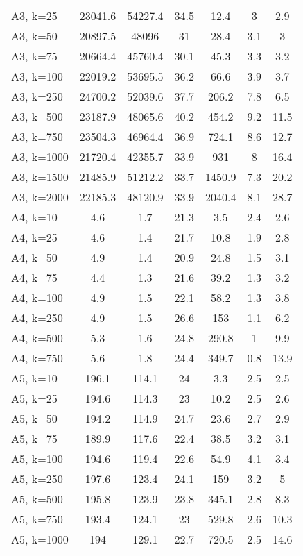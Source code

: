\documentclass{article}
\begin{document}
\begin{center}
\begin{table}[h]
\begin{tabular}{|l||c|c|c|c|c|c|}
    A3, k=25 & 23041.6 & 54227.4 & 34.5 & 12.4 & 3 & 2.9\\
    A3, k=50 & 20897.5 & 48096 & 31 & 28.4 & 3.1 & 3\\
    A3, k=75 & 20664.4 & 45760.4 & 30.1 & 45.3 & 3.3 & 3.2\\
    A3, k=100 & 22019.2 & 53695.5 & 36.2 & 66.6 & 3.9 & 3.7\\
    A3, k=250 & 24700.2 & 52039.6 & 37.7 & 206.2 & 7.8 & 6.5\\
    A3, k=500 & 23187.9 & 48065.6 & 40.2 & 454.2 & 9.2 & 11.5\\
    A3, k=750 & 23504.3 & 46964.4 & 36.9 & 724.1 & 8.6 & 12.7\\
    A3, k=1000 & 21720.4 & 42355.7 & 33.9 & 931 & 8 & 16.4\\
    A3, k=1500 & 21485.9 & 51212.2 & 33.7 & 1450.9 & 7.3 & 20.2\\
A3, k=2000 & 22185.3 & 48120.9 & 33.9 & 2040.4 & 8.1 & 28.7\\
    \hline
    A4, k=10 & 4.6 & 1.7 & 21.3 & 3.5 & 2.4 & 2.6\\
    A4, k=25 & 4.6 & 1.4 & 21.7 & 10.8 & 1.9 & 2.8\\
    A4, k=50 & 4.9 & 1.4 & 20.9 & 24.8 & 1.5 & 3.1\\
    A4, k=75 & 4.4 & 1.3 & 21.6 & 39.2 & 1.3 & 3.2\\
    A4, k=100 & 4.9 & 1.5 & 22.1 & 58.2 & 1.3 & 3.8\\
    A4, k=250 & 4.9 & 1.5 & 26.6 & 153 & 1.1 & 6.2\\
    A4, k=500 & 5.3 & 1.6 & 24.8 & 290.8 & 1 & 9.9\\
    A4, k=750 & 5.6 & 1.8 & 24.4 & 349.7 & 0.8 & 13.9\\
    \hline
    A5, k=10 & 196.1 & 114.1 & 24 & 3.3 & 2.5 & 2.5\\
    A5, k=25 & 194.6 & 114.3 & 23 & 10.2 & 2.5 & 2.6\\
    A5, k=50 & 194.2 & 114.9 & 24.7 & 23.6 & 2.7 & 2.9\\
    A5, k=75 & 189.9 & 117.6 & 22.4 & 38.5 & 3.2 & 3.1\\
    A5, k=100 & 194.6 & 119.4 & 22.6 & 54.9 & 4.1 & 3.4\\
    A5, k=250 & 197.6 & 123.4 & 24.1 & 159 & 3.2 & 5\\
    A5, k=500 & 195.8 & 123.9 & 23.8 & 345.1 & 2.8 & 8.3\\
    A5, k=750 & 193.4 & 124.1 & 23 & 529.8 & 2.6 & 10.3\\
    A5, k=1000 & 194 & 129.1 & 22.7 & 720.5 & 2.5 & 14.6\\

\end{tabular}
\end{table}
\end{center}
\end{document}
